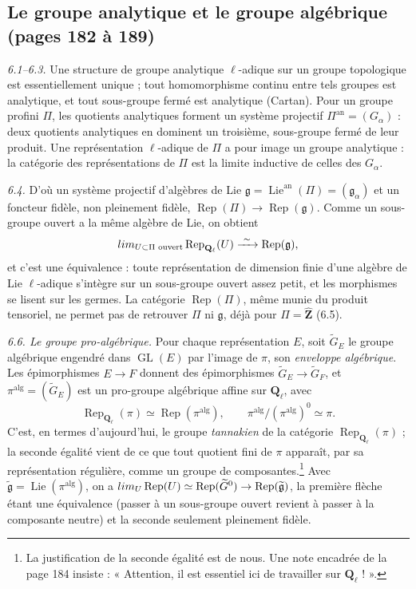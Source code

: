 \documentclass[11pt,a4paper]{article}
\begin{document}
\subsection*{Le groupe analytique et le groupe algébrique (pages 182 à 189)}

\emph{6.1--6.3.} Une structure de groupe analytique $\ell$-adique sur un groupe
topologique est essentiellement unique ; tout homomorphisme continu entre tels
groupes est analytique, et tout sous-groupe fermé est analytique (Cartan). Pour
un groupe profini $\Pi$, les quotients analytiques forment un système projectif
$\Pi^{\mathrm{an}} = (G_\alpha)$ : deux quotients analytiques en dominent un
troisième, sous-groupe fermé de leur produit. Une représentation $\ell$-adique de
$\Pi$ a pour image un groupe analytique : la catégorie des représentations de
$\Pi$ est la limite inductive de celles des $G_\alpha$.

\emph{6.4.} D'où un système projectif d'algèbres de Lie
$\mathfrak{g} = \operatorname{Lie}^{\mathrm{an}}(\Pi) = (\mathfrak{g}_\alpha)$ et un
foncteur fidèle, non pleinement fidèle, $\operatorname{Rep}(\Pi) \to
\operatorname{Rep}(\mathfrak{g})$. Comme un sous-groupe ouvert a la même algèbre
de Lie, on obtient
\[
  \varinjlim_{U \subset \Pi \text{ ouvert}} \operatorname{Rep}_{\mathbf{Q}_\ell}(U)
  \xrightarrow{\ \sim\ } \operatorname{Rep}(\mathfrak{g}),
\]
et c'est une équivalence : toute représentation de dimension finie d'une algèbre
de Lie $\ell$-adique s'intègre sur un sous-groupe ouvert assez petit, et les
morphismes se lisent sur les germes. La catégorie
$\operatorname{Rep}(\Pi)$, même munie du produit tensoriel, ne permet pas de
retrouver $\Pi$ ni $\mathfrak{g}$, déjà pour $\Pi = \widehat{\mathbf{Z}}$ (6.5).

\emph{6.6. Le groupe pro-algébrique.} Pour chaque représentation $E$, soit
$\widetilde G_E$ le groupe algébrique engendré dans $\operatorname{GL}(E)$ par
l'image de $\pi$, son \emph{enveloppe algébrique}. Les épimorphismes
$E \to F$ donnent des épimorphismes $\widetilde G_E \to \widetilde G_F$, et
$\pi^{\mathrm{alg}} = (\widetilde G_E)$ est un pro-groupe algébrique affine sur
$\mathbf{Q}_\ell$, avec
\[
  \operatorname{Rep}_{\mathbf{Q}_\ell}(\pi) \simeq \operatorname{Rep}(\pi^{\mathrm{alg}}),
  \qquad \pi^{\mathrm{alg}} / (\pi^{\mathrm{alg}})^0 \simeq \pi .
\]
C'est, en termes d'aujourd'hui, le groupe \emph{tannakien} de la catégorie
$\operatorname{Rep}_{\mathbf{Q}_\ell}(\pi)$ ; la seconde égalité vient de ce que
tout quotient fini de $\pi$ apparaît, par sa représentation régulière, comme un
groupe de composantes.\footnote{La justification de la seconde égalité est de
nous. Une note encadrée de la page 184 insiste : « Attention, il est essentiel
ici de travailler sur $\mathbf{Q}_\ell$ ! ».} Avec
$\widetilde{\mathfrak{g}} = \operatorname{Lie}(\pi^{\mathrm{alg}})$, on a
$\varinjlim_U \operatorname{Rep}(U) \simeq \operatorname{Rep}(\widetilde G^0) \to
\operatorname{Rep}(\widetilde{\mathfrak{g}})$, la première flèche étant une
équivalence (passer à un sous-groupe ouvert revient à passer à la composante
neutre) et la seconde seulement pleinement fidèle.
\end{document}
